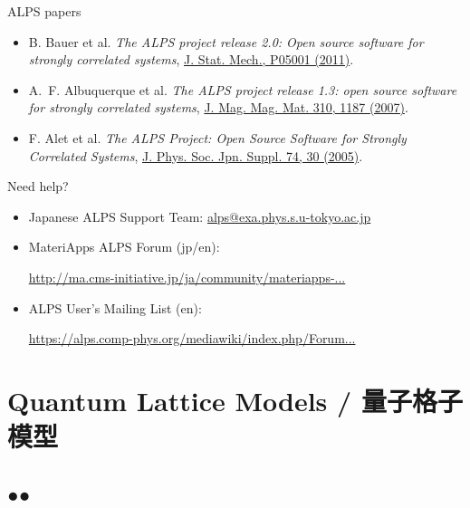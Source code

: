 \begin{frame}[t,fragile]{ALPS papers}
  \begin{itemize}
    \setlength{\itemsep}{1em}
  \item B. Bauer et al. {\it The ALPS project release 2.0: Open source software for strongly correlated systems}, \href{http://iopscience.iop.org/1742-5468/2011/05/P05001}{J. Stat. Mech., P05001 (2011)}.
  \item A.~F. Albuquerque et al. {\it The ALPS project release 1.3: open source software for strongly correlated systems}, \href{http://dx.doi.org/10.1016/j.jmmm.2006.10.304}{J. Mag. Mag. Mat. 310, 1187 (2007)}.
  \item F. Alet et al. {\it The ALPS Project: Open Source Software for
      Strongly Correlated Systems}, \href{http://jpsj.ipap.jp/link?JPSJS/74S/30}{J. Phys. Soc. Jpn. Suppl. 74, 30 (2005)}.
  \end{itemize}
\end{frame}

\begin{frame}[t,fragile]{Need help?}
  \begin{itemize}
    \setlength{\itemsep}{1em}
  \item Japanese ALPS Support Team: {\footnotesize \href{mailto:alps@exa.phys.s.u-tokyo.ac.jp}{alps@exa.phys.s.u-tokyo.ac.jp}}
  \item MateriApps ALPS Forum (jp/en):

    {\footnotesize \href{http://ma.cms-initiative.jp/ja/community/materiapps-messageboard/alps}{http://ma.cms-initiative.jp/ja/community/materiapps-...}}
  \item ALPS User's Mailing List (en):

    {\footnotesize \href{https://alps.comp-phys.org/mediawiki/index.php/Forum:Overview}{https://alps.comp-phys.org/mediawiki/index.php/Forum...}}
  \end{itemize}
\end{frame}

\section{Quantum Lattice Models / 量子格子模型}
\subsection*{{\protect\color{red}●}{\protect\color{blue}●}}

